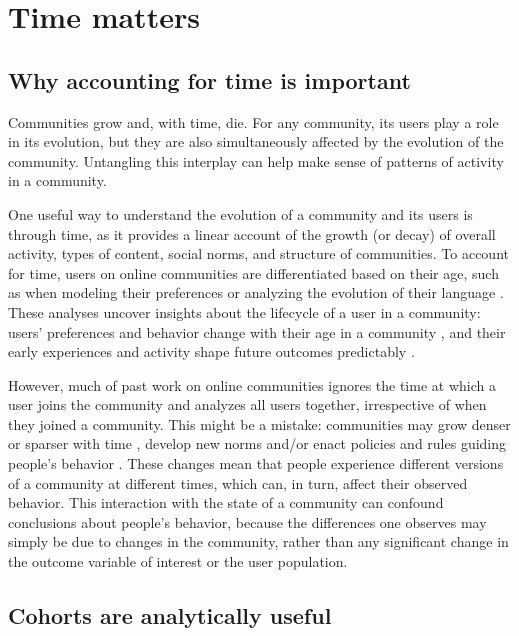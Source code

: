 \section{Time matters} 
\subsection{Why accounting for time is important}

Communities grow and, with time, die. For any community, its users play a role in its evolution, but they are also simultaneously affected by the evolution of the community. Untangling this interplay can help make sense of patterns of activity in a community.

One useful way to understand the evolution of a community and its users is through time, as it provides a linear account of the growth (or decay) of overall activity, types of content, social norms, and structure of communities. To account for time, users on online communities are differentiated based on their age, such as when modeling their preferences \cite{McAuley2013} or analyzing the evolution of their language \cite{Danescu-niculescu-mizil2013}. These analyses uncover insights about the lifecycle of a user in a community: users' preferences and behavior change with their age in a community \cite{Panciera2010}, and their early experiences and activity shape future outcomes predictably \cite{Tan2015,Yang2009,Panciera2009, Miller2015}. 

However, much of past work on online communities ignores the time at which a user joins the community and analyzes all users together, irrespective of when they joined a community. 
This might be a mistake: communities may grow denser or sparser with time \cite{Leskovec2005}, develop new norms \cite{Kooti2010} and/or enact policies and rules guiding people's behavior \cite{Butler2008}.
These changes mean that people experience different versions of a community at different times, which can, in turn, affect their observed behavior. This interaction with the state of a community can confound conclusions about people's behavior, because the differences one observes may simply be due to changes in the community, rather than any significant change in the outcome variable of interest or the user population.  


\subsection{Cohorts are analytically useful}


